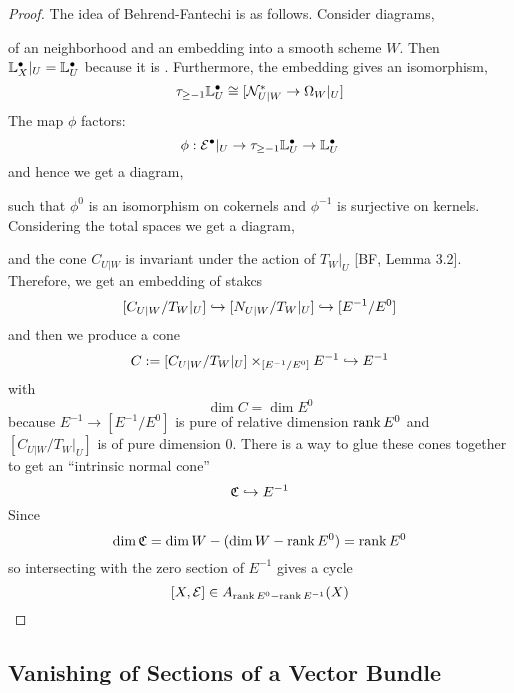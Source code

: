 \documentclass[12pt]{article}
\begin{document}
\begin{proof}
The idea of Behrend-Fantechi is as follows. Consider diagrams,
\begin{center}
\end{center}
of an \etale neighborhood and an embedding into a smooth scheme $W$. Then $\mathbb{L}_X^\bullet |_U = \mathbb{L}_U^\bullet$ because it is \etale. Furthermore, the embedding gives an isomorphism,
\[ \tau_{\ge -1} \mathbb{L}_U^\bullet \cong [ \mathcal{N}^*_{U|W} \to \Omega_W |_U] \]
The map $\phi$ factors:
\[ \phi : \mathcal{E}^\bullet|_U \to \tau_{\ge -1} \mathbb{L}_U^\bullet \to \mathbb{L}_U^\bullet \]
and hence we get a diagram,
\begin{center}
\end{center}
such that $\phi^0$ is an isomorphism on cokernels and $\phi^{-1}$ is surjective on kernels. Considering the total spaces we get a diagram,
\begin{center}
\end{center}
and the cone $C_{U|W}$ is invariant under the action of $T_W|_U$ [BF, Lemma 3.2]. Therefore, we get an embedding of stakcs
\[ [C_{U|W} / T_W|_U] \hookrightarrow [N_{U|W} / T_W|_U] \hookrightarrow [E^{-1}/E^0] \]
and then we produce a cone
\[ C := [C_{U|W}/T_W|_U] \times_{[E^{-1}/E^0]} E^{-1} \hookrightarrow E^{-1} \]
with
\[ \dim{C} = \dim{E^0} \]
because $E^{-1} \to [E^{-1} / E^0]$ is pure of relative dimension $\operatorname{\mathrm{rank}}{E^0}$ and $[C_{U|W} / T_W |_U]$ is of pure dimension $0$.
There is a way to glue these cones together to get an ``intrinsic normal cone''
\[ \mathfrak{C} \hookrightarrow E^{-1} \]
Since
\[ \dim{\mathfrak{C}} = \dim{W} - (\dim{W} - \operatorname{\mathrm{rank}}{E^0}) = \operatorname{\mathrm{rank}}{E^0} \]
so intersecting with the zero section of $E^{-1}$ gives a cycle
\[ [X, \mathcal{E}] \in A_{\operatorname{\mathrm{rank}}{E^0} - \operatorname{\mathrm{rank}}{E^{-1}}}(X) \]
\end{proof}


\subsection{Vanishing of Sections of a Vector Bundle}
\end{document}
